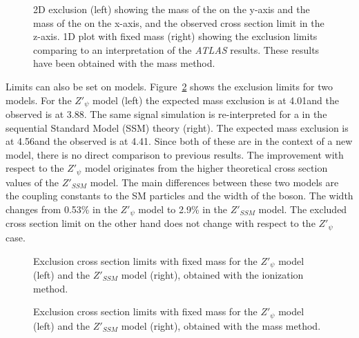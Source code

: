  \begin{figure}[h!]
    \centering
    \caption{2D exclusion (left) showing the mass of the \ZPrime on the y-axis and the mass of the \TauPrime on the x-axis, and the observed cross section limit in the z-axis. 1D plot with fixed  \TauPrime mass (right) showing the exclusion limits comparing to an interpretation of the \textit{ATLAS} results. These results have been obtained with the mass method.}
    \label{fig:massLimZPrimeTauPrime}
\end{figure}

Limits can also be set on \ZPrime models.
Figure~\ref{fig:massLimDYtauPrimeModels} shows the exclusion limits for two \ZPrime models. For the $Z'_{\psi}$ model (left) the expected mass exclusion is at 4.01\TeV and the observed is at 3.88\TeV.
The same signal simulation is re-interpreted for a \ZPrime in the sequential Standard Model (SSM) theory \cite{HEWETT1989193} (right). The expected mass exclusion is at 4.56\TeV and the observed is at 4.41\TeV. Since both of these are in the context of a new model, there is no direct comparison to previous results.
The improvement with respect to the $Z'_{\psi}$ model originates from the higher theoretical cross section values of the  $Z'_{SSM}$ model. The main differences between these two models are the coupling constants to the {SM} particles and the width of the \ZPrime boson. The width changes from 0.53\% in the  $Z'_{\psi}$ model to 2.9\% in the  $Z'_{SSM}$ model. The excluded cross section limit on the other hand does not change with respect to the $Z'_{\psi}$  case.

 \begin{figure}[h!]
    \centering
    \caption{Exclusion cross section limits with fixed \TauPrime mass for the $Z'_{\psi}$ model (left) and the $Z'_{SSM}$ model (right),
	 obtained with the ionization method.}
    \label{fig:massLimDYtauPrimeModels}
\end{figure}


 \begin{figure}[h!]
    \centering
    \caption{Exclusion cross section limits with fixed \TauPrime mass for the $Z'_{\psi}$ model (left) and the $Z'_{SSM}$ model (right),
	 obtained with the mass method.}
    \label{fig:massLim7}
\end{figure}
